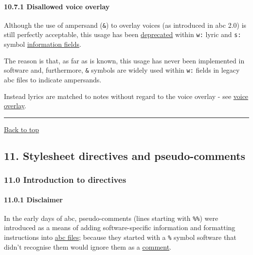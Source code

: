 \hypertarget{disallowed_voice_overlay}{\paragraph{10.7.1 Disallowed
voice overlay}\label{disallowed_voice_overlay}}

Although the use of ampersand (\texttt{\&}) to overlay voices (as
introduced in abc 2.0) is still perfectly acceptable, this usage has
been \protect\hyperlink{outdated_syntax}{deprecated} within \texttt{w:}
lyric and \texttt{s:} symbol
\protect\hyperlink{information_field_definition}{information fields}.

The reason is that, as far as is known, this usage has never been
implemented in software and, furthermore, \texttt{\&} symbols are widely
used within \texttt{w:} fields in legacy abc files to indicate
ampersands.

Instead lyrics are matched to notes without regard to the voice overlay
- see \protect\hyperlink{voice_overlay}{voice overlay}.

\begin{center}\rule{0.5\linewidth}{\linethickness}\end{center}

\protect\hyperlink{}{Back to top}

\hypertarget{stylesheet_directives_and_pseudo-comments}{\subsection{11.
Stylesheet directives and
pseudo-comments}\label{stylesheet_directives_and_pseudo-comments}}

\hypertarget{introduction_to_directives}{\subsubsection{11.0
Introduction to directives}\label{introduction_to_directives}}

\hypertarget{disclaimer}{\paragraph{11.0.1
Disclaimer}\label{disclaimer}}

In the early days of abc, pseudo-comments (lines starting with
\texttt{\%\%}) were introduced as a means of adding software-specific
information and formatting instructions into
\protect\hyperlink{abc_file_definition}{abc files}; because they started
with a \texttt{\%} symbol software that didn't recognise them would
ignore them as a \protect\hyperlink{comment_definition}{comment}.

